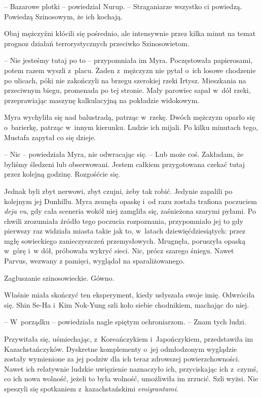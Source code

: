 \documentclass[oneside,polish,11pt,sfheadings]{mwbk}
\begin{document}
-- Bazarowe plotki -- powiedział Nurup. -- Straganiarze wszystko ci
powiedzą. Powiedzą Szinosowym, że ich kochają.

Obaj mężczyźni kłócili się pośrednio, ale intensywnie przez kilka minut
na temat prognoz działań terrorystycznych przeciwko Szinosowietom.

-- Nie jesteśmy tutaj po to -- przypomniała im Myra. Poczęstowała
papierosami, potem razem wyszli z~placu. Żaden z~mężczyzn nie pytał o~ich losowe chodzenie po ulicach, póki nie zakończyli na brzegu szerokiej
rzeki Irtysz. Mieszkania na przeciwnym biegu, promenada po tej stronie.
Mały parowiec sapał w~dół rzeki, przeprawiając maszynę kalkulacyjną na
pokładzie widokowym.

Myra wychyliła się nad balustradą, patrząc w~rzekę. Dwóch mężczyzn
oparło się o~barierkę, patrząc w~innym kierunku. Ludzie ich mijali. Po
kilku minutach tego, Mustafa zapytał co się dzieje.

-- Nic -- powiedziała Myra, nie odwracając się. -- Lub może coś. Zakładam,
że byliśmy śledzeni lub obserwowani. Jestem całkiem przygotowana czekać
tutaj przez kolejną godzinę. Rozgośćcie się.

Jednak byli zbyt nerwowi, zbyt czujni, żeby tak robić. Jedynie zapalili
po kolejnym jej Dunhillu. Myra zsunęła opaskę i~od razu została trafiona
poczuciem \textit{deja vu}, gdy cała sceneria wokół niej zamgliła się,
zaśnieżona szarymi pyłami. Po chwili zrozumiała źródło tego poczucia
rozpoznania, przypomniało jej to gdy pierwszy raz widziała miasta takie
jak to, w~latach dziewięćdziesiątych: przez mgłę sowieckiego
zanieczyszczeń przemysłowych. Mrugnęła, poruszyła opaską w~górę i~w dół,
próbowała wykryć sieci. Nic, prócz szarego śniegu. Nawet Parvus, wezwany
z pamięci, wyglądał na sparaliżowanego.

Zagłuszanie szinosowieckie. Gówno.

Właśnie miała skończyć ten eksperyment, kiedy usłyszała swoje imię.
Odwróciła się. Shin Se-Ha i~Kim Nok-Yung szli koło siebie chodnikiem,
machając do niej.

-- W~porządku -- powiedziała nagle spiętym ochroniarzom. -- Znam tych
ludzi.

Przywitała się, uśmiechając, z~Koreańczykiem i~Japończykiem,
przedstawiła im Kazachstańczyków. Dyskretne komplementy o~jej
odmłodzonym wyglądzie zostały wymienione za jej podziw dla ich teraz
zdrowszej powierzchowności. Nawet ich relatywnie ludzkie uwięzienie
naznaczyło ich, przyciskając ich z~czymś, co ich nowa wolność, jeżeli to
była wolność, umożliwiła im zrzucić. Szli wyżsi. Nie speszyli się
spotkaniem z~kazachstańskimi \textit{emigrantami}.
\end{document}
